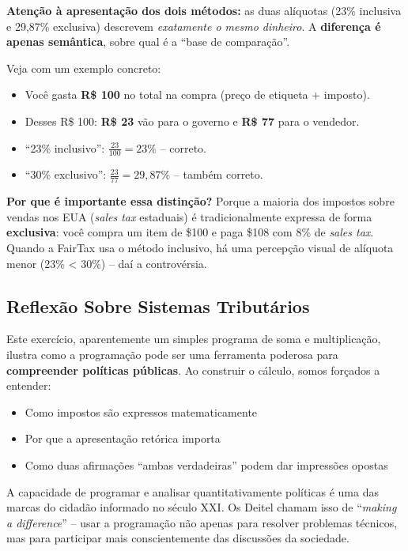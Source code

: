 \documentclass[12pt,a4paper]{article}
\begin{document}
\begin{atencao}
\textbf{Atenção à apresentação dos dois métodos:} as duas alíquotas (23\% inclusiva
e 29,87\% exclusiva) descrevem \textit{exatamente o mesmo dinheiro}. A
\textbf{diferença é apenas semântica}, sobre qual é a ``base de comparação''.

Veja com um exemplo concreto:
\begin{itemize}[noitemsep]
  \item Você gasta \textbf{R\$ 100} no total na compra (preço de etiqueta + imposto).
  \item Desses R\$ 100: \textbf{R\$ 23} vão para o governo e \textbf{R\$ 77} para o
  vendedor.
  \item ``23\% inclusivo'': $\frac{23}{100} = 23\%$ -- correto.
  \item ``30\% exclusivo'': $\frac{23}{77} = 29{,}87\%$ -- também correto.
\end{itemize}

\textbf{Por que é importante essa distinção?} Porque a maioria dos impostos sobre
vendas nos EUA (\textit{sales tax} estaduais) é tradicionalmente expressa de forma
\textbf{exclusiva}: você compra um item de \$100 e paga \$108 com 8\% de \textit{sales
tax}. Quando a FairTax usa o método inclusivo, há uma percepção visual de alíquota
menor (23\% < 30\%) -- daí a controvérsia.
\end{atencao}

\subsection*{Reflexão Sobre Sistemas Tributários}

\begin{tcolorbox}[colback=ecolightgreen,colframe=ecogreen,
  title={\bfseries Computação como ferramenta para entendimento cívico}]

Este exercício, aparentemente um simples programa de soma e multiplicação, ilustra
como a programação pode ser uma ferramenta poderosa para \textbf{compreender
políticas públicas}. Ao construir o cálculo, somos forçados a entender:
\begin{itemize}[noitemsep]
  \item Como impostos são expressos matematicamente
  \item Por que a apresentação retórica importa
  \item Como duas afirmações ``ambas verdadeiras'' podem dar impressões opostas
\end{itemize}

A capacidade de programar e analisar quantitativamente políticas é uma das marcas
do cidadão informado no século XXI. Os Deitel chamam isso de ``\textit{making a
difference}'' -- usar a programação não apenas para resolver problemas técnicos,
mas para participar mais conscientemente das discussões da sociedade.
\end{tcolorbox}
\end{document}
